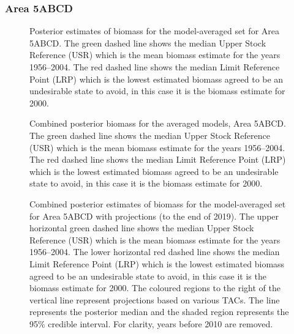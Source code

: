 \documentclass[11pt]{book}
\begin{document}
\hypertarget{area-5abcd}{%
\subsubsection{Area 5ABCD}\label{area-5abcd}}
\begin{figure}[htb]

{\centering {} 

}

\caption{Posterior estimates of biomass for the model-averaged set for Area 5ABCD. The green dashed line shows the median Upper Stock Reference (USR) which is the mean biomass estimate for the years 1956--2004. The red dashed line shows the median Limit Reference Point (LRP) which is the lowest estimated biomass agreed to be an undesirable state to avoid, in this case it is the biomass estimate for 2000.}\label{fig:fig-model-average-biomass-comp-5abcd}
\end{figure}
\begin{figure}[htb]

{\centering {} 

}

\caption{Combined posterior biomass for the averaged models, Area 5ABCD. The green dashed line shows the median Upper Stock Reference (USR) which is the mean biomass estimate for the years 1956--2004. The red dashed line shows the median Limit Reference Point (LRP) which is the lowest estimated biomass agreed to be an undesirable state to avoid, in this case it is the biomass estimate for 2000.}\label{fig:fig-model-average-biomass-5abcd}
\end{figure}
\clearpage
\begin{figure}[htb]

{\centering {} 

}

\caption{Combined posterior estimates of biomass for the model-averaged set for Area 5ABCD with projections (to the end of 2019).  The upper horizontal green dashed line shows the median Upper Stock Reference (USR) which is the mean biomass estimate for the years 1956--2004. The lower horizontal red dashed line shows the median Limit Reference Point (LRP) which is the lowest estimated biomass agreed to be an undesirable state to avoid, in this case it is the biomass estimate for 2000. The coloured regions to the right of the vertical line represent projections based on various TACs. The line represents the posterior median and the shaded region represents the 95\% credible interval. For clarity, years before 2010 are removed.}\label{fig:fig-model-average-biomass-5abcd-proj}
\end{figure}
\clearpage
\end{document}
